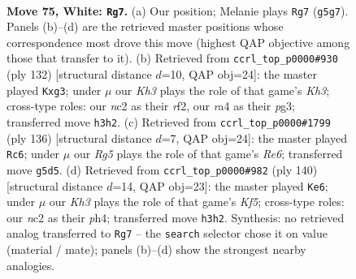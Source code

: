\documentclass[11pt]{article}
\begin{document}
\clearpage

\begin{figure}[p]\centering
\begin{subfigure}{0.46\textwidth}\centering
\resizebox{\linewidth}{!}{%
\newchessgame
\chessboard[
  setfen={8/8/5B1k/6R1/r7/7K/2n1bP2/8 w - - 10 75},
  showmover=false,
  pgfstyle=straightmove, color=movearrow, markmove={g5-g7}
]}
\caption{}
\end{subfigure}\hfill
\begin{subfigure}{0.46\textwidth}\centering
\resizebox{\linewidth}{!}{%
\newchessgame
\chessboard[
  setfen={8/2B5/3R4/2k4P/4b3/6pK/5r2/8 w - - 1 67},
  showmover=false,
  pgfstyle=straightmove, color=movearrow, markmove={h3-g3}
]}
\caption{}
\end{subfigure}
\\[4pt]
\begin{subfigure}{0.46\textwidth}\centering
\resizebox{\linewidth}{!}{%
\newchessgame
\chessboard[
  setfen={8/5k2/4R3/5B2/5b2/5P2/5K2/r7 w - - 3 69},
  showmover=false,
  pgfstyle=straightmove, color=movearrow, markmove={e6-c6}
]}
\caption{}
\end{subfigure}\hfill
\begin{subfigure}{0.46\textwidth}\centering
\resizebox{\linewidth}{!}{%
\newchessgame
\chessboard[
  setfen={3k4/2R5/1r1B4/5K2/7p/8/8/8 w - - 4 71},
  showmover=false,
  pgfstyle=straightmove, color=movearrow, markmove={f5-e6}
]}
\caption{}
\end{subfigure}
\caption{\textbf{Move 75, White: \texttt{Rg7}.} (a) Our position; Melanie plays \texttt{Rg7} (\texttt{g5g7}). Panels (b)--(d) are the retrieved master positions whose correspondence most drove this move (highest QAP objective among those that transfer to it). (b) Retrieved from \texttt{ccrl\_top\_p0000\#930} (ply 132) [structural distance $d$=10, QAP obj=24]: the master played \texttt{Kxg3}; under $\mu$ our \emph{Kh3} plays the role of that game's \emph{Kh3}; cross-type roles: our \emph{n}c2 as their \emph{r}f2, our \emph{r}a4 as their \emph{p}g3; transferred move \texttt{h3h2}. (c) Retrieved from \texttt{ccrl\_top\_p0000\#1799} (ply 136) [structural distance $d$=7, QAP obj=24]: the master played \texttt{Rc6}; under $\mu$ our \emph{Rg5} plays the role of that game's \emph{Re6}; transferred move \texttt{g5d5}. (d) Retrieved from \texttt{ccrl\_top\_p0000\#982} (ply 140) [structural distance $d$=14, QAP obj=23]: the master played \texttt{Ke6}; under $\mu$ our \emph{Kh3} plays the role of that game's \emph{Kf5}; cross-type roles: our \emph{n}c2 as their \emph{p}h4; transferred move \texttt{h3h2}. Synthesis: no retrieved analog transferred to \texttt{Rg7} -- the \texttt{search} selector chose it on value (material / mate); panels (b)--(d) show the strongest nearby analogies.}
\label{fig:thought-m148}
\end{figure}
\end{document}
